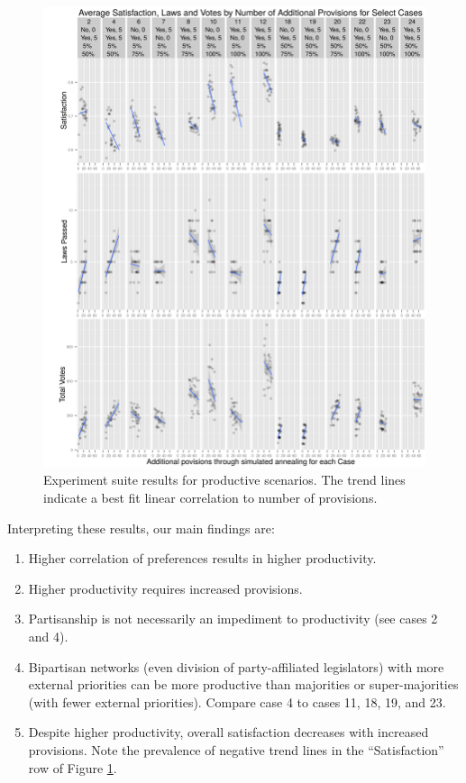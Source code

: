 \documentclass[pdftex,12pt]{llncs}
\begin{document}
\begin{figure}[h!]
\centering
\includegraphics[width=4.75in]{combinedCases_crop.pdf}
\caption[ ]{Experiment suite results for productive scenarios.  The trend lines indicate a best fit linear correlation to number of provisions.} 
\label{combined}
\end{figure}

Interpreting these results, our main findings are:
\begin{enumerate}
\item Higher correlation of preferences results in higher productivity.
\item Higher productivity requires increased provisions.
\item Partisanship is not necessarily an impediment to productivity (see cases 2 and 4).
\item Bipartisan networks (even division of party-affiliated legislators) with more external priorities can be more productive than majorities or super-majorities (with fewer external priorities).  Compare case 4 to cases 11, 18, 19, and 23.
\item Despite higher productivity, overall satisfaction decreases with increased provisions.  Note the prevalence of negative trend lines in the ``Satisfaction'' row of Figure \ref{combined}.
\end{enumerate}
\end{document}
